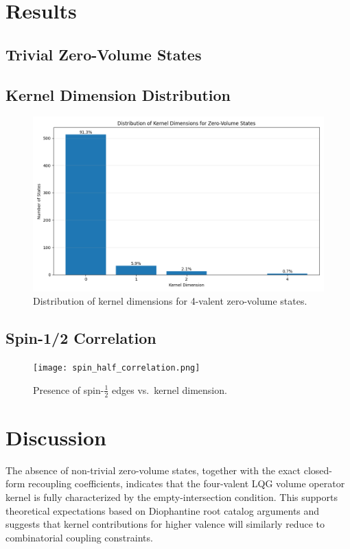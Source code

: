 \documentclass[11pt]{article}
\begin{document}
\section{Results}
\subsection{Trivial Zero-Volume States}


\subsection{Kernel Dimension Distribution}
\begin{figure}[ht]
  \centering
  \includegraphics[width=0.8\linewidth]{kernel_dimension_distribution.png}
  \caption{Distribution of kernel dimensions for 4-valent zero-volume states.}
  \label{fig:kernel_dim_dist}
\end{figure}

\subsection{Spin-1/2 Correlation}
\begin{figure}[ht]
  \centering
  \texttt{[image: spin\_half\_correlation.png]}
  \caption{Presence of spin-$\tfrac{1}{2}$ edges vs.\ kernel dimension.}
  \label{fig:spin_half_corr}
\end{figure}

\section{Discussion}
The absence of non-trivial zero-volume states, together with the exact closed-form recoupling coefficients, indicates that the four-valent LQG volume operator kernel is fully characterized by the empty-intersection condition. This supports theoretical expectations based on Diophantine root catalog arguments and suggests that kernel contributions for higher valence will similarly reduce to combinatorial coupling constraints.
\end{document}
